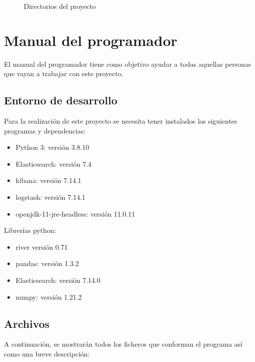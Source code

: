 \begin{figure}[h]
	\caption{Directorios del proyecto}
	\label{directoriosdelproyecto}
\end{figure}

\newpage
\section{Manual del programador}

El manual del programador tiene como objetivo ayudar a todas aquellas personas que vayan a trabajar con este proyecto.
\subsection{Entorno de desarrollo}

Para la realización de este proyecto se necesita tener instalados los siguientes programas y dependencias:

\begin{itemize}
    \item Python 3: versión 3.8.10 
    \item Elasticsearch: versión 7.4
    \item kibana: versión 7.14.1
    \item logstash: versión 7.14.1
    \item openjdk-11-jre-headless: versión 11.0.11
\end{itemize}
Librerías python:
\begin{itemize}
    \item river versión 0.71
    \item pandas: versión 1.3.2
    \item Elasticsearch: versión 7.14.0
    \item numpy: versión 1.21.2
\end{itemize}

\subsection{Archivos}
A continuación, se mostrarán todos los ficheros que conforman el programa así como una breve descripción:

